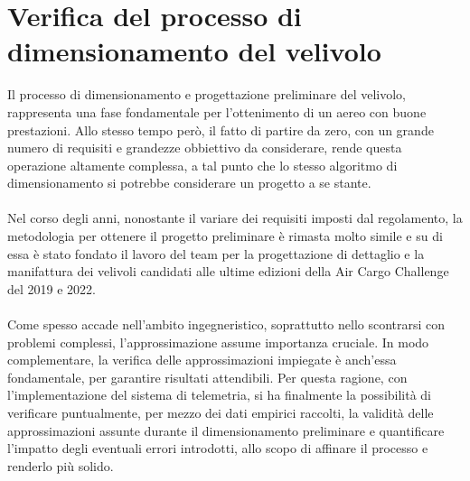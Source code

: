 \documentclass[12pt]{article}
\begin{document}
\section{Verifica del processo di dimensionamento del velivolo}
Il processo di dimensionamento e progettazione preliminare del velivolo, rappresenta una fase fondamentale per l'ottenimento di un aereo con buone prestazioni. Allo stesso tempo però, il fatto di partire da zero, con un grande numero di requisiti e grandezze obbiettivo da considerare, rende questa operazione altamente complessa, a tal punto che lo stesso algoritmo di dimensionamento si potrebbe considerare un progetto a se stante. 
\\\\
Nel corso degli anni, nonostante il variare dei requisiti imposti dal regolamento, la metodologia per ottenere il progetto preliminare è rimasta molto simile e su di essa è stato fondato il lavoro del team per la progettazione di dettaglio e la manifattura dei velivoli candidati alle ultime edizioni della Air Cargo Challenge del 2019 e 2022.
\\\\
Come spesso accade nell'ambito ingegneristico, soprattutto nello scontrarsi con problemi complessi, l'approssimazione assume importanza cruciale. In modo complementare, la verifica delle approssimazioni impiegate è anch'essa fondamentale, per garantire risultati attendibili. Per questa ragione, con l'implementazione del sistema di telemetria, si ha finalmente la possibilità di verificare puntualmente, per mezzo dei dati empirici raccolti, la validità delle approssimazioni assunte durante il dimensionamento preliminare e quantificare l'impatto degli eventuali errori introdotti, allo scopo di affinare il processo e renderlo più solido.
\end{document}
